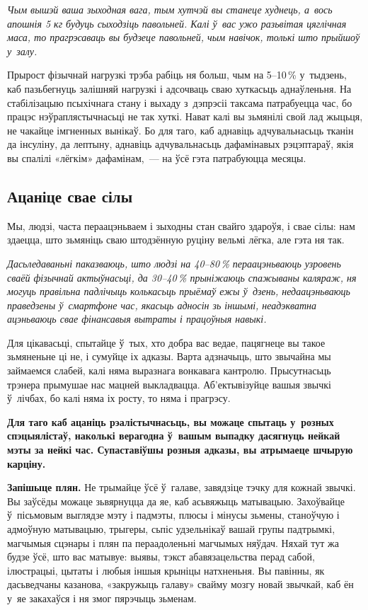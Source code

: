 \emph{Чым вышэй ваша зыходная вага, тым хутчэй вы станеце худнець, а~вось апошнія 5 кг будуць сыходзіць павольней. Калі ў~вас ужо разьвітая цяглічная маса, то прагрэсаваць вы будзеце павольней, чым навічок, толькі што прыйшоў у~залу.}

Прырост фізычнай нагрузкі трэба рабіць ня больш, чым на 5--10\,\% у~тыдзень, каб пазьбегнуць залішняй нагрузкі і адсочваць сваю хуткасьць аднаўленьня. На стабілізацыю псыхічнага стану і выхаду з~дэпрэсіі таксама патрабуецца час, бо працэс нэўраплястычнасьці не так хуткі. Нават калі вы зьмянілі свой лад жыцьця, не чакайце імгненных вынікаў. Бо для таго, каб аднавіць адчувальнасьць тканін да інсуліну, да лептыну, аднавіць адчувальнасьць дафамінавых рэцэптараў, якія вы спалілі «лёгкім» дафамінам,~--- на ўсё гэта патрабуюцца месяцы.

\subsection*{Ацаніце свае сілы}

Мы, людзі, часта пераацэньваем і зыходны стан свайго здароўя, і свае сілы: нам здаецца, што зьмяніць сваю штодзённую руціну вельмі лёгка, але гэта ня так. 

\emph{Дасьледаваньні паказваюць, што людзі на 40--80\,\% пераацэньваюць узровень сваёй фізычнай актыўнасьці, да 30--40\,\% прыніжаюць спажываны каляраж, ня могуць правільна падлічыць колькасьць прыёмаў ежы ў~дзень, недаацэньваюць праведзены ў~смартфоне час, якасьць адносін зь іншымі, неадэкватна ацэньваюць свае фінансавыя вытраты і працоўныя навыкі.}

Для цікавасьці, спытайце ў~тых, хто добра вас ведае, пацягнеце вы такое зьмяненьне ці не, і сумуйце іх адказы. Варта адзначыць, што звычайна мы займаемся слабей, калі няма выразнага вонкавага кантролю. Прысутнасьць трэнера прымушае нас мацней выкладвацца. Аб'ектывізуйце вашыя звычкі ў~лічбах, бо калі няма іх росту, то няма і прагрэсу. 

\textbf{Для таго каб ацаніць рэалістычнасьць, вы можаце спытаць у~розных спэцыялістаў, наколькі верагодна ў~вашым выпадку дасягнуць нейкай мэты за нейкі час. Супаставіўшы розныя адказы, вы атрымаеце шчырую карціну.}

\textbf{Запішыце плян.} Не трымайце ўсё ў~галаве, завядзіце тэчку для кожнай звычкі. Вы заўсёды можаце зьвярнуцца да яе, каб асьвяжыць матывацыю. Захоўвайце ў~пісьмовым выглядзе мэту і падмэты, плюсы і мінусы зьмены, станоўчую і адмоўную матывацыю, трыгеры, сьпіс удзельнікаў вашай групы падтрымкі, магчымыя сцэнары і плян па пераадоленьні магчымых няўдач. Няхай тут жа будзе ўсё, што вас матывуе: выявы, тэкст абавязацельства перад сабой, ілюстрацыі, цытаты і любыя іншыя крыніцы натхненьня. Вы павінны, як дасьведчаны казанова, «закружыць галаву» свайму мозгу новай звычкай, каб ён у~яе закахаўся і ня змог пярэчыць зьменам.

